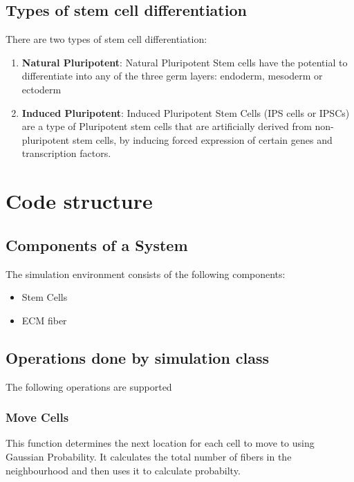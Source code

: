 \documentclass[11pt]{report}
\begin{document}
  
  \section{\color{red}Types of stem cell differentiation}
  There are two types of stem cell differentiation:\\ 
  \begin{enumerate}
   \item \textbf{Natural Pluripotent}: Natural Pluripotent Stem cells have the potential to differentiate into any of the three germ layers: endoderm, mesoderm or ectoderm
   \item \textbf{Induced Pluripotent}: Induced Pluripotent Stem Cells (IPS cells or IPSCs) are a type of Pluripotent stem cells that are artificially derived from non-pluripotent stem cells, by  inducing forced expression of certain genes and transcription factors.

  \end{enumerate}
  
  \chapter{Code structure}
   \section{\color{red} Components of a System}
  The simulation environment consists of the following components:
  \begin{itemize}
   \item Stem Cells
   \item ECM fiber
  \end{itemize}
  
  \section{\color{red} Operations done by simulation class}
  The following operations are supported
  \subsection{\color{blue}Move Cells}
  This function determines the next location for each cell to move to using Gaussian Probability. It calculates the 
  total number of fibers in the neighbourhood and then uses it to calculate probabilty.
\end{document}
